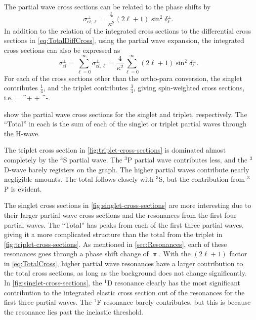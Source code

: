 \documentclass[Dissertation.tex]{subfiles}
\begin{document}
The partial wave cross sections can be 
related to the phase shifts by
\citep[p.]{Bransden2003}
\begin{equation}
\label{eq:PartialCross}
\sigma_{el,\ell}^\pm = \frac{4}{\kappa^2} (2\ell+1) \sin^2 \delta_\ell^\pm.
\end{equation}
In addition to the relation of the integrated cross sections to the
differential cross sections in \cref{eq:TotalDiffCross},
using the partial wave expansion, the integrated cross sections can also be 
expressed as \citep[p.]{Bransden2003}
\begin{equation}
\label{eq:TotalCross}
\sigma_{el}^\pm = \sum_{\ell=0}^\infty \sigma_{el,\ell}^\pm = \frac{4}{\kappa^2} \sum_{\ell=0}^\infty (2\ell+1) \sin^2 \delta_\ell^\pm.
\end{equation}
For each of the cross sections other than the ortho-para conversion, the 
singlet contributes $\frac{1}{4}$, and the triplet contributes $\frac{3}{4}$, 
giving spin-weighted cross sections, i.e. \cite{Ward1987}
\beq
\label{eq:SpinWeightCS}
\sigma =  \sigma^+ +  \sigma^-.
\eeq

 show the partial
wave cross sections for the singlet and triplet, respectively. The ``Total''
in each is the sum of each of the singlet or triplet partial waves through the
H-wave.

The triplet cross section in \cref{fig:triplet-cross-sections} is dominated 
almost completely by the $^3$S partial wave. The $^3$P partial wave 
contributes less, and the $^3$D-wave barely registers on the graph. The 
higher partial waves contribute nearly negligible amounts. The total follows
closely with $^3$S, but the contribution from $^3$P is evident.

The singlet cross sections in \cref{fig:singlet-cross-sections} are more
interesting due to their larger partial wave cross sections and the resonances
from the first four partial waves. The ``Total'' has peaks from each of the
first three partial waves, giving it a more complicated structure than the
total from the triplet in \cref{fig:triplet-cross-sections}. As mentioned
in \cref{sec:Resonances}, each of these resonances goes through a phase shift
change of $\uppi$. With the $(2\ell+1)$ factor in \cref{eq:TotalCross},
higher partial wave resonances have a larger contribution to the total
cross sections, as long as the background does not change significantly.
In \cref{fig:singlet-cross-sections}, the $^1$D resonance clearly has the
most significant contribution to the integrated elastic cross section out of
the resonances for the first three partial waves. The $^1$F resonance barely
contributes, but this is because the resonance lies past the inelastic 
threshold.
\end{document}
